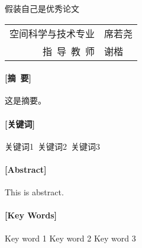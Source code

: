 \documentclass[scheme=chinese, a4paper]{ctexart}
\begin{document}
\begin{center}
\heiti
{ 假装自己是优秀论文}  %
\\[14.5pt]
\begin{tabular}{rl}
空间科学与技术专业   %
&
席若尧  %
\\
指\ 导\ 教\ 师
&
谢楷  %
\end{tabular}
\end{center}


\paragraph{[摘\ 要]\ } 这是摘要。
\paragraph{[关键词]\ } 关键词1\ 关键词2\ 关键词3
\\
\paragraph{[Abstract]\ } This is abstract.
\paragraph{[Key Words]\ } Key word 1 \quad Key word 2 \quad Key word 3

\renewcommand\paragraph{} %





\end{document}
